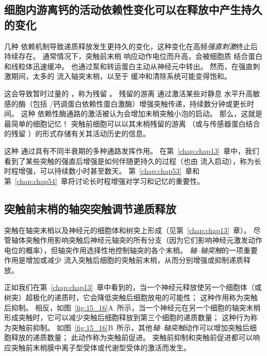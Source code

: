 \subsection{细胞内游离钙的活动依赖性变化可以在释放中产生持久的变化}

几种  依赖机制导致递质释放发生更持久的变化，这种变化在高频\textit{强直刺激}终止后持续存在。
通常情况下，突触前末梢  响应动作电位而升高，会被细胞质  结合蛋白和线粒体迅速缓冲。
也通过泵和转运蛋白主动从神经元中转出。
然而，在强直刺激期间，太多的  流入轴突末梢，以至于  缓冲和清除系统可能变得饱和。


这会导致暂时过量的 ，称为残留 。
残留的游离  通过激活某些对静息  水平升高敏感的酶（包括 /钙调蛋白依赖性蛋白激酶）增强突触传递，持续数分钟或更长时间。
这种  依赖性酶通路的激活被认为会增加末梢突触小泡的启动。
那么，这就是最简单的细胞记忆！
突触前细胞可以以其末梢残留的游离 （或与传感器蛋白结合的残留 ）的形式存储有关其活动历史的信息。


这种  通过具有不同半衰期的多种通路发挥作用。
在第~\ref{chap:chap13}~章中，我们看到了某些突触的强直后增强是如何伴随更持久的过程（也由  流入启动），称为长时程增强，可以持续数小时甚至数天。
第~\ref{chap:chap53}~章和第~\ref{chap:chap54}~章将讨论长时程增强对学习和记忆的重要性。



\subsection{突触前末梢的轴突突触调节递质释放}

突触在轴突末梢以及神经元的细胞体和树突上形成（见第~\ref{chap:chap13}~章）。
尽管轴体突触作用影响突触后神经元轴突的所有分支（因为它们影响神经元激发动作电位的概率），但轴突作用选择性地控制轴突的各个末梢。
\textit{轴–轴突触}的一项重要作用是增加或减少  流入突触后细胞的突触前末梢，从而分别增强或抑制递质释放。


正如我们在第~\ref{chap:chap13}~章中看到的，当一个神经元释放使另一个细胞体（或树突）超极化的递质时，它会降低突触后细胞放电的可能性；
这种作用称为突触后抑制。
相反，如图~\ref{fig:15_16}A~所示，当一个神经元在另一个细胞的轴突末梢形成突触时，它可以减少突触后细胞释放到第三个细胞的递质数量；
这种行为称为突触前抑制。
如图~\ref{fig:15_16}B~所示，其他\textit{轴–轴突触}动作可以增加突触后细胞释放的递质数量；
此动作称为突触前促进。
突触前抑制和突触前促进都可以响应突触前末梢膜中离子型受体或代谢型受体的激活而发生。


